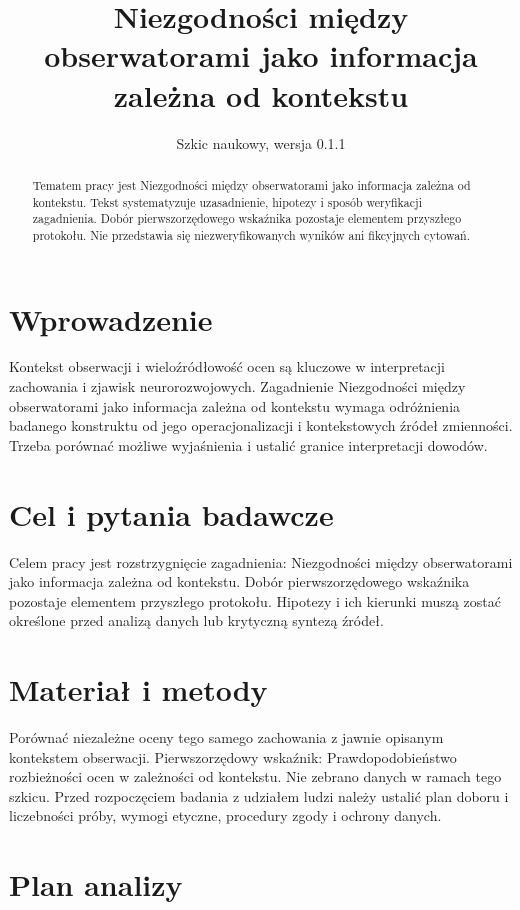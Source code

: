 \documentclass[11pt,a4paper]{article}
\title{Niezgodności między obserwatorami jako informacja zależna od kontekstu}
\author{}
\date{Szkic naukowy, wersja 0.1.1}
\begin{document}
\maketitle

\begin{abstract}

Tematem pracy jest Niezgodności między obserwatorami jako informacja zależna od kontekstu. Tekst systematyzuje uzasadnienie, hipotezy i sposób weryfikacji zagadnienia. Dobór pierwszorzędowego wskaźnika pozostaje elementem przyszłego protokołu. Nie przedstawia się niezweryfikowanych wyników ani fikcyjnych cytowań.

\end{abstract}

\section{Wprowadzenie}

Kontekst obserwacji i wieloźródłowość ocen są kluczowe w interpretacji zachowania i zjawisk neurorozwojowych. Zagadnienie Niezgodności między obserwatorami jako informacja zależna od kontekstu wymaga odróżnienia badanego konstruktu od jego operacjonalizacji i kontekstowych źródeł zmienności. Trzeba porównać możliwe wyjaśnienia i ustalić granice interpretacji dowodów.

\section{Cel i pytania badawcze}

Celem pracy jest rozstrzygnięcie zagadnienia: Niezgodności między obserwatorami jako informacja zależna od kontekstu. Dobór pierwszorzędowego wskaźnika pozostaje elementem przyszłego protokołu. Hipotezy i ich kierunki muszą zostać określone przed analizą danych lub krytyczną syntezą źródeł.

\section{Materiał i metody}

Porównać niezależne oceny tego samego zachowania z jawnie opisanym kontekstem obserwacji. Pierwszorzędowy wskaźnik: Prawdopodobieństwo rozbieżności ocen w zależności od kontekstu. Nie zebrano danych w ramach tego szkicu. Przed rozpoczęciem badania z udziałem ludzi należy ustalić plan doboru i liczebności próby, wymogi etyczne, procedury zgody i ochrony danych.

\section{Plan analizy}
\end{document}
